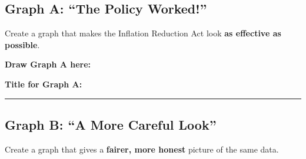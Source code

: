 \documentclass[letterpaper,10pt]{article}
\begin{document}
\subsection*{Graph A: ``The Policy Worked!''}

Create a graph that makes the Inflation Reduction Act look \textbf{as effective as possible}.


\vspace{1em}
\noindent\textbf{Draw Graph A here:}

\vspace{0.3em}
\begin{center}
\end{center}

\noindent\textbf{Title for Graph A:} \rule{8cm}{0.4pt}

\subsection*{Graph B: ``A More Careful Look''}

Create a graph that gives a \textbf{fairer, more honest} picture of the same data.

\end{document}

